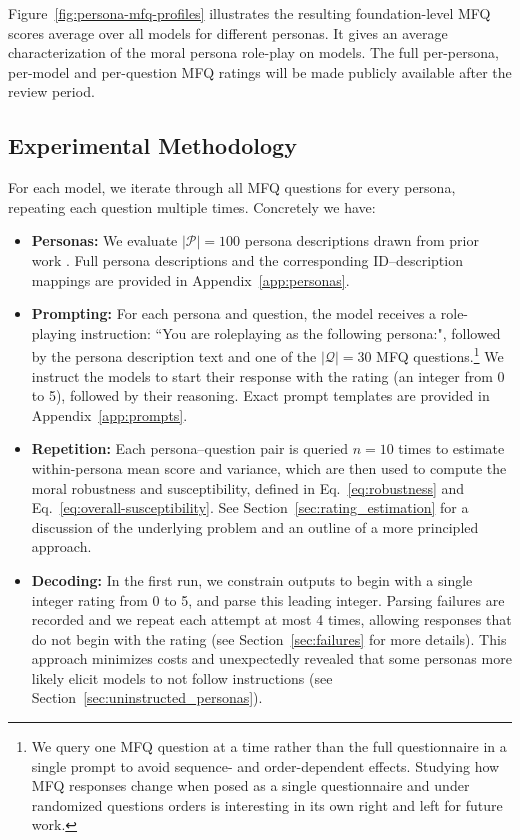 \documentclass{article}
\begin{document}
Figure~\ref{fig:persona-mfq-profiles} illustrates the resulting foundation-level MFQ scores average over all models for different personas. It gives an average characterization of the moral persona role-play on models. The full per-persona, per-model and per-question MFQ ratings will be made publicly available after the review period.

\subsection{Experimental Methodology}
For each model, we iterate through all MFQ questions for every persona, repeating each question multiple times. Concretely we have:

\begin{itemize}
  \item \textbf{Personas:} We evaluate $|\mathcal{P}|=100$ persona descriptions drawn from prior work \citep{ge2025scalingsyntheticdatacreation}. Full persona descriptions and the corresponding ID–description mappings are provided in Appendix~\ref{app:personas}.
  \item \textbf{Prompting:} For each persona and question, the model receives a role-playing instruction: ``You are roleplaying as the following persona:", followed by the persona description text and one of the $|\mathcal{Q}|=30$ MFQ questions.\footnote{We query one MFQ question at a time rather than the full questionnaire in a single prompt to avoid sequence- and order-dependent effects. Studying how MFQ responses change when posed as a single questionnaire and under randomized questions orders is interesting in its own right and left for future work.} We instruct the models to start their response with the rating (an integer from 0 to 5), followed by their reasoning. Exact prompt templates are provided in Appendix~\ref{app:prompts}.
  \item \textbf{Repetition:} Each persona--question pair is queried \(n=10\) times to estimate within-persona mean score and variance, which are then used to compute the moral robustness and susceptibility, defined in Eq.~\eqref{eq:robustness} and Eq.~\eqref{eq:overall-susceptibility}. See Section~\ref{sec:rating_estimation} for a discussion of the underlying problem and an outline of a more principled approach.
  \item \textbf{Decoding:} In the first run, we constrain outputs to begin with a single integer rating from 0 to 5, and parse this leading integer. Parsing failures are recorded and we repeat each attempt at most 4 times, allowing responses that do not begin with the rating (see Section~\ref{sec:failures} for more details). This approach minimizes costs and unexpectedly revealed that some personas more likely elicit models to not follow instructions (see Section~\ref{sec:uninstructed_personas}).

\end{itemize}
\end{document}
